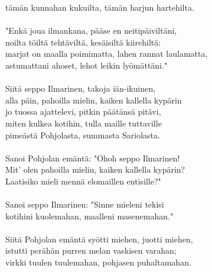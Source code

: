 tämän kunnahan kukuilta, tämän harjun hartehilta.                 \\
                                                                  \\
"Enkä joua ilmankana, pääse en neitipäiviltäni,                   \\
noilta töiltä tehtäviltä, kesäisiltä kiirehiltä:                  \\
marjat on maalla poimimatta, lahen rannat laulamatta,             \\
astumattani ahoset, lehot leikin lyömättäni."                     \\
                                                                  \\
Siitä seppo Ilmarinen, takoja iän-ikuinen,                        \\
alla päin, pahoilla mielin, kaiken kallella kypärin               \\
jo tuossa ajattelevi, pitkin päätänsä pitävi,                     \\
miten kulkea kotihin, tulla maille tuttaville                     \\
pimeästä Pohjolasta, summasta Sariolasta.                         \\
                                                                  \\
Sanoi Pohjolan emäntä: "Ohoh seppo Ilmarinen!                     \\
Mit' olen pahoilla mielin, kaiken kallella kypärin?               \\
Laatisiko mieli mennä elomaillen entisille?"                      \\
                                                                  \\
Sanoi seppo Ilmarinen: "Sinne mieleni tekisi                      \\
kotihini kuolemahan, maalleni masenemahan."                       \\
                                                                  \\
Siitä Pohjolan emäntä syötti miehen, juotti miehen,               \\
istutti perähän purren melan vaskisen varahan;                    \\
virkki tuulen tuulemahan, pohjasen puhaltamahan.                  \\
                                                                  \\
